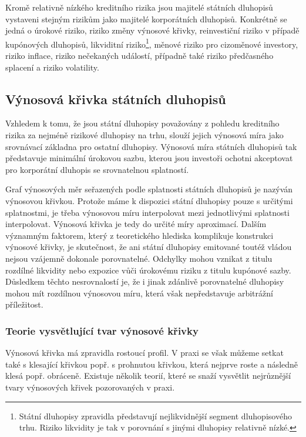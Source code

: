 \documentclass[a4paper]{book}
\begin{document}
Kromě relativně nízkého kreditního rizika jsou majitelé státních dluhopisů vystaveni stejným rizikům jako majitelé korporátních dluhopisů. Konkrétně se jedná o úrokové riziko, riziko změny výnosové křivky, reinvestiční riziko v případě kupónových dluhopisů, likviditní riziko\footnote{Státní dluhopisy zpravidla představují nejlikvidnější segment dluhopisového trhu. Riziko likvidity je tak v porovnání s jinými dluhopisy relativně nízké.}, měnové riziko pro cizoměnové investory, riziko inflace, riziko nečekaných událostí, případně také riziko předčasného splacení a riziko volatility.

\subsection{Výnosová křivka státních dluhopisů}

Vzhledem k tomu, že jsou státní dluhopisy považovány z pohledu kreditního rizika za nejméně rizikové dluhopisy na trhu, slouží jejich výnosová míra jako srovnávací základna pro ostatní dluhopisy. Výnosová míra státních dluhopisů tak představuje minimální úrokovou sazbu, kterou jsou investoři ochotni akceptovat pro korporátní dluhopis se srovnatelnou splatností.

Graf výnosových měr seřazených podle splatnosti státních dluhopisů je nazýván výnosovou křivkou. Protože máme k dispozici státní dluhopisy pouze s určitými splatnostmi, je třeba výnosovou míru interpolovat mezi jednotlivými splatnosti interpolovat. Výnosová křivka je tedy do určité míry aproximací. Dalším významným faktorem, který z teoretického hlediska komplikuje konstrukci výnosové křivky, je skutečnost, že ani státní dluhopisy emitované toutéž vládou nejsou vzájemně dokonale porovnatelné. Odchylky mohou vznikat z titulu rozdílné likvidity nebo expozice vůči úrokovému riziku z titulu kupónové sazby. Důsledkem těchto nesrovnalostí je, že i jinak zdánlivě porovnatelné dluhopisy mohou mít rozdílnou výnosovou míru, která však nepředstavuje arbitrážní příležitost.

\subsubsection{Teorie vysvětlující tvar výnosové křivky}

Výnosová křivka má zpravidla rostoucí profil. V praxi se však můžeme setkat také s klesající křivkou popř. s prohnutou křivkou, která nejprve roste a následně klesá popř. obráceně. Existuje několik teorií, které se snaží vysvětlit nejrůznější tvary výnosových křivek pozorovaných v praxi.
\end{document}
